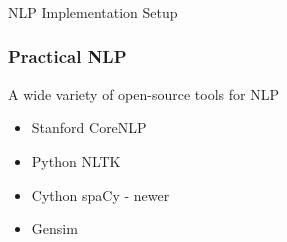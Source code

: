 \begin{frame}[fragile]\frametitle{}

\begin{center}
{\Large NLP Implementation Setup}
\end{center}
\end{frame}
%


\begin{frame}[fragile]\frametitle{Practical NLP}
A wide variety of open-source tools for NLP
  \begin{itemize}
    \item Stanford CoreNLP
    \item Python NLTK
    \item Cython spaCy - newer
    \item Gensim
      \end{itemize}
\end{frame}



